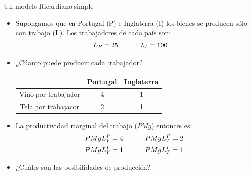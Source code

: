 \documentclass{beamer}
\begin{document}
\begin{frame}{Un modelo Ricardiano simple}
\begin{itemize}
    \item Supongamos que en Portugal (P) e Inglaterra (I) los bienes se producen sólo con trabajo (L). Los trabajadores de cada país son:
            \begin{equation*}
                \begin{aligned}
                L_P=25 \, \hspace{10mm} &\, L_I=100
                \end{aligned}
            \end{equation*}
    \item ¿Cúanto puede producir cada trabajador? \vspace{2mm}
        \begin{center}
            \begin{tabular}{|c|c|c|} \hline
            \rowcolor{blue!20}
                & Portugal & Inglaterra \\ \hline
                Vino por trabajador   & 4 & 1 \\ \hline
                Tela por trabajador   & 2 & 1 \\ \hline     
            \end{tabular}
        \end{center}
    \vspace{2mm}
    \item La productividad marginal del trabajo ($PMg$) entonces es: 
            \begin{equation*}
                \begin{aligned}
                    PMgL_V^{P} = 4 \, \hspace{10mm} &\, PMgL_T^{P} = 2 \\
                    PMgL_V^{I} = 1 \, \hspace{10mm}&\, PMgL_T^{I} = 1
                \end{aligned}
            \end{equation*}
       \vspace{-4mm}
     \item ¿Cuáles son las posibilidades de producción?    
    \end{itemize} 
\end{frame}
\end{document}
